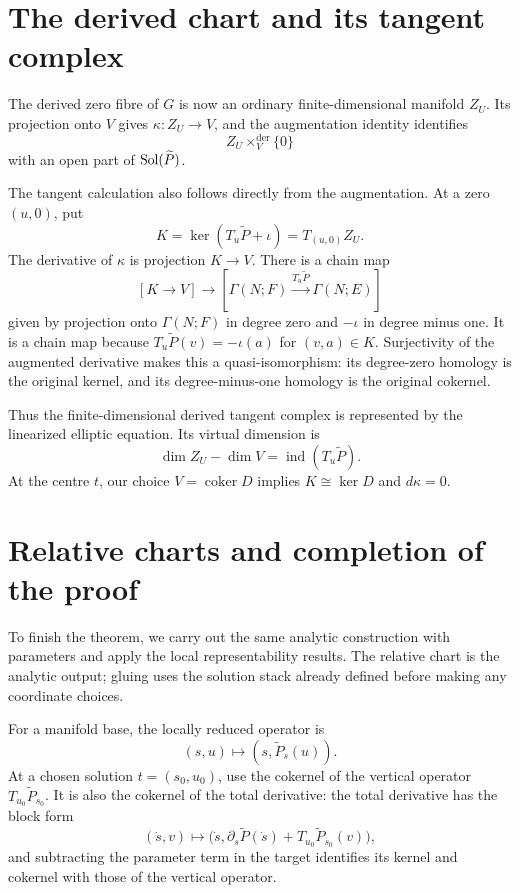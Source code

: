 \section{The derived chart and its tangent complex}

The derived zero fibre of $G$ is now an ordinary finite-dimensional
manifold $Z_U$. Its projection onto $V$ gives
$\kappa\colon Z_U\to V$, and the augmentation identity identifies
\[
 Z_U\times_V^{\mathrm{der}}\{0\}
\]
with an open part of $\operatorname{Sol}(\widetilde P)$.

The tangent calculation also follows directly from the augmentation.
At a zero $(u,0)$, put
\[
 K=\ker(T_u\widetilde P+\iota)=T_{(u,0)}Z_U.
\]
The derivative of $\kappa$ is projection $K\to V$.
There is a chain map
\[
 [K\longrightarrow V]\longrightarrow
 [\Gamma(N;F)\xrightarrow{T_u\widetilde P}\Gamma(N;E)]
\]
given by projection onto $\Gamma(N;F)$ in degree zero and $-\iota$
in degree minus one. It is a chain map because
$T_u\widetilde P(v)=-\iota(a)$ for $(v,a)\in K$.
Surjectivity of the augmented derivative makes this a
quasi-isomorphism: its degree-zero homology is the original kernel,
and its degree-minus-one homology is the original cokernel.

Thus the finite-dimensional derived tangent complex is represented
by the linearized elliptic equation. Its virtual dimension is
\[
 \dim Z_U-\dim V=\operatorname{ind}(T_u\widetilde P).
\]
At the centre $t$, our choice $V=\operatorname{coker}D$ implies
$K\cong\ker D$ and $d\kappa=0$.

\section{Relative charts and completion of the proof}

To finish the theorem, we carry out the same analytic construction
with parameters and apply the local representability results. The
relative chart is the analytic output; gluing uses the solution stack
already defined before making any coordinate choices.

For a manifold base, the locally reduced operator is
\[
 (s,u)\longmapsto(s,\widetilde P_s(u)).
\]
At a chosen solution $t=(s_0,u_0)$, use the cokernel of the vertical
operator $T_{u_0}\widetilde P_{s_0}$.
It is also the cokernel of the total derivative: the total derivative
has the block form
\[
 (\dot s,v)\longmapsto
 \bigl(\dot s,\partial_s\widetilde P(\dot s)
                    +T_{u_0}\widetilde P_{s_0}(v)\bigr),
\]
and subtracting the parameter term in the target identifies its
kernel and cokernel with those of the vertical operator.

